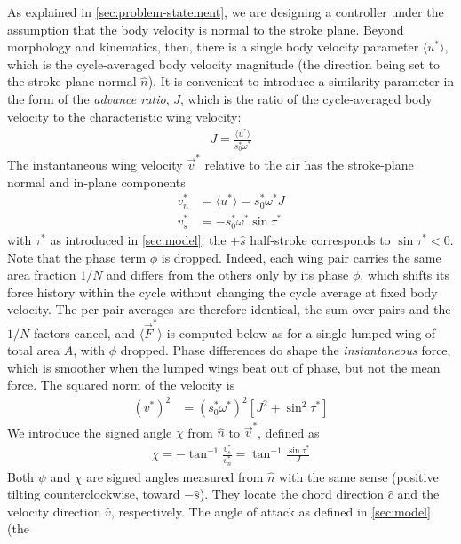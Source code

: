 \documentclass[11pt,letterpaper]{article}
\begin{document}
As explained in \autoref{sec:problem-statement}, we
are designing a controller under the assumption that the body velocity
is normal to the stroke plane. Beyond morphology and kinematics,
then, there is a single body velocity parameter $\langle u^* \rangle$,
which is the cycle-averaged body velocity magnitude (the direction
being set to the stroke-plane normal $\hat{n}$).
It is convenient to introduce a similarity parameter in
the form of the \emph{advance ratio}, $J$, which is the
ratio of the cycle-averaged body velocity to the
characteristic wing velocity:
\begin{align}
    J = \frac{\langle u^* \rangle}{s_0^* \omega^*}
\end{align}
The instantaneous wing velocity $\vec{v}^*$
relative to the air has the stroke-plane normal and
in-plane components
\begin{align}
    v_n^* &= \langle u^* \rangle = s_0^* \omega^* J \\
    v_s^* &= -s_0^* \omega^* \sin\tau^*
\end{align}
with $\tau^*$ as introduced in \autoref{sec:model};
the $+\hat{s}$ half-stroke corresponds to $\sin\tau^* < 0$.
Note that the phase term $\phi$ is dropped. Indeed, each wing pair
carries the same area fraction $1/N$ and differs from the others only by
its phase $\phi$, which shifts its force history within the cycle
without changing the cycle average at fixed body velocity. The
per-pair averages are therefore identical, the sum over pairs and
the $1/N$ factors cancel, and $\langle \vec{F}^* \rangle$ is
computed below as for a single lumped wing of total area $A$, with
$\phi$ dropped. Phase differences do shape the
\emph{instantaneous} force, which is smoother
when the lumped wings beat out of phase, but not the mean force.
The squared norm of the velocity is
\begin{align}
    (v^*)^2 &= \left(s_0^* \omega^*\right)^2 \left[ J^2 + \sin^2\tau^* \right]\label{eq:v_sq}
\end{align}
We introduce the signed angle $\chi$ from
$\hat{n}$ to $\vec{v}^*$, defined as
\begin{align}
    \chi = -\tan^{-1} \frac{v_s^*}{v_n^*} = \tan^{-1} \frac{\sin\tau^*}{J}
\end{align}
Both $\psi$ and $\chi$ are signed angles measured from $\hat{n}$ with
the same sense (positive tilting counterclockwise, toward $-\hat{s}$).
They locate the chord direction $\hat{c}$ and the velocity direction $\hat{v}$, respectively.
The angle of attack as defined in \autoref{sec:model} (the
\end{document}
